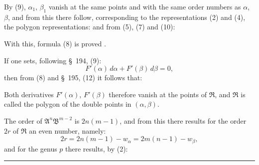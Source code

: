 By (9), $\alpha_1$, $\beta_1$ vanish at the same points and with the same order numbers as $\alpha$, $\beta$, and from this there follow, corresponding to the representations (2) and (4), the polygon representations:
and from (5), (7) and (10):

With this, formula (8) is proved .

If one sets, following \S\ 194, (9):
\[
F'(\alpha)\,d\alpha + F'(\beta)\,d\beta = 0,
\]
then from (8) and \S\ 195, (12) it follows that:

Both derivatives $F'(\alpha)$, $F'(\beta)$ therefore vanish at the points of $\mathfrak{R}$, and $\mathfrak{R}$ is called the polygon of the double points in $(\alpha,\beta)$.

The order of $\mathfrak{A}^n\mathfrak{B}^{m-2}$ is $2n(m-1)$, and from this there results for the order $2r$ of $\mathfrak{R}$ an even number, namely:
\[
2r = 2n(m-1) - w_\alpha = 2m(n-1) - w_\beta,
\]
and for the genus $p$ there results, by (2):

\begin{center}
\rule{4cm}{0.4pt}
\end{center}

